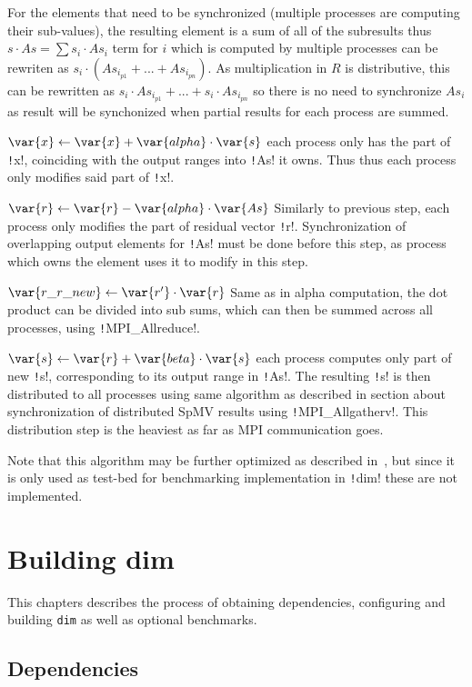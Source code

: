 \documentclass[thesis=M,english]{FITthesis}[2019/12/23]
\newcommand{\csre}[1]{\texttt!#1!}
\begin{document}
For the elements that need to be synchronized (multiple processes are computing their sub-values),
the resulting element is a sum of all of the subresults thus $s \cdot As = \sum s_i \cdot As_i$ term for $i$
which is computed by multiple processes can be rewriten as $s_i \cdot (As_{i_{p1}} + ... + As_{i_{pn}})$.
As multiplication in $R$ is distributive, this can be rewritten as $s_i \cdot As_{i_{p1}} + ... + s_i \cdot As_{i_{pn}}$
so there is no need to synchronize $As_i$ as result will be synchonized when partial results for
each process are summed.

$\var{x} \gets \var{x} + \var{alpha} \cdot \var{s}$ each process only has the part of \csre{x},
coinciding with the output ranges into \csre{As} it owns. Thus thus each process only
modifies said part of \csre{x}.

$\var{r} \gets \var{r} - \var{alpha} \cdot \var{As}$ Similarly to previous step, each process
only modifies the part of residual vector \csre{r}. Synchronization of overlapping
output elements for \csre{As} must be done before this step, as process which owns the
element uses it to modify  in this step.

$\var{r\_r\_new} \gets \var{r'} \cdot \var{r}$ Same as in alpha computation, the dot product
can be divided into sub sums, which can then be summed across all processes, using
\csre{MPI_Allreduce}.

$\var{s} \gets \var{r} + \var{beta} \cdot \var{s}$ each process computes only part of new
\csre{s}, corresponding to its output range in \csre{As}. The resulting \csre{s} is
then distributed to all processes using same algorithm as described in section
about synchronization of distributed SpMV results using \csre{MPI_Allgatherv}.
This distribution step is the heaviest as far as MPI communication goes.

Note that this algorithm may be further optimized as described in~\cite{distCGwRedSync}, but
since it is only used as test-bed for benchmarking implementation in \csre{dim} these are not
implemented.

\chapter{Building dim}

This chapters describes the process of obtaining dependencies, configuring and building \texttt{dim} as well
as optional benchmarks.

\section{Dependencies}\label{bdim:deps}
\end{document}
